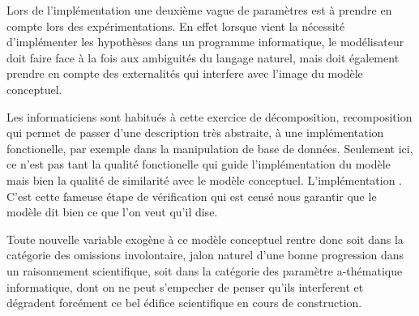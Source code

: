 
Lors de l'implémentation une deuxième vague de paramètres est à prendre en compte lors des expérimentations. En effet lorsque vient la nécessité d'implémenter les hypothèses dans un programme informatique, le modélisateur doit faire face à la fois aux ambiguités du langage naturel, mais doit également prendre en compte des externalités qui interfere avec l'image du modèle conceptuel.

Les informaticiens sont habitués à cette exercice de décomposition, recomposition qui permet de passer d'une description très abstraite, à une implémentation fonctionelle, par exemple dans la manipulation de base de données. Seulement ici, ce n'est pas tant la qualité fonctionelle qui guide l'implémentation du modèle mais bien la qualité de similarité avec le modèle conceptuel. L'implémentation . C'est cette fameuse étape de vérification qui est censé nous garantir que le modèle dit bien ce que l'on veut qu'il dise.

Toute nouvelle variable exogène à ce modèle conceptuel rentre donc soit dans la catégorie des omissions involontaire, jalon naturel d'une bonne progression dans un raisonnement scientifique, soit dans la catégorie des paramètre a-thématique informatique, dont on ne peut s'empecher de penser qu'ils interferent et dégradent forcément ce bel édifice scientifique en cours de construction.







